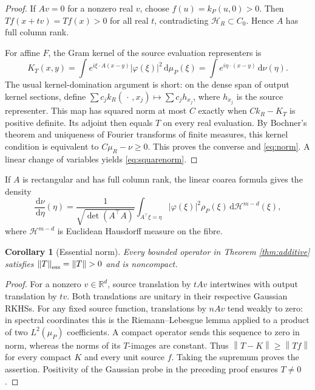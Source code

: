 \documentclass[11pt,a4paper]{article}
\newtheorem{corollary}[theorem]{Corollary}
\theoremstyle{remark}
\newcommand{\R}{\mathbb R}
\newcommand{\HH}{\mathcal H}
\newcommand{\dd}{\,\mathrm d}
\newcommand{\norm}[1]{\left\lVert#1\right\rVert}
\begin{document}
\begin{proof}
If $Av=0$ for a nonzero real $v$, choose
$f(u)=k_P(u,0)>0$. Then $Tf(x+tv)=Tf(x)>0$ for all real $t$,
contradicting $\HH_R\subset C_0$. Hence $A$ has full column rank.

For affine $F$, the Gram kernel of the source evaluation
representers is
\begin{equation}\label{eq:gramstationary}
 K_T(x,y)=\int e^{i\xi\cdot A(x-y)}|\varphi(\xi)|^2\dd\mu_P(\xi)
         =\int e^{i\eta\cdot(x-y)}\dd\nu(\eta).
\end{equation}
The usual kernel-domination argument is short: on the dense span
of output kernel sections, define
$\sum c_jk_R(\,\cdot\,,x_j)\mapsto\sum c_jh_{x_j}$,
where $h_{x_j}$ is the source representer. This map has squared
norm at most $C$ exactly when $Ck_R-K_T$ is positive definite.
Its adjoint then equals $T$ on every real evaluation.
By Bochner's theorem and uniqueness of Fourier transforms of finite
measures, this kernel condition is equivalent to
$C\mu_R-\nu\ge0$. This proves the converse and \eqref{eq:norm}.
A linear change of variables yields \eqref{eq:squarenorm}.
\end{proof}

If $A$ is rectangular and has full column rank, the linear coarea
formula gives the density
\begin{equation}\label{eq:coarea}
 \frac{\dd\nu}{\dd\eta}(\eta)=
 \frac{1}{\sqrt{\det(A^\top A)}}
 \int_{A^\top\xi=\eta}|\varphi(\xi)|^2\rho_P(\xi)
                   \dd\mathcal H^{m-d}(\xi),
\end{equation}
where $\mathcal H^{m-d}$ is Euclidean Hausdorff measure on the fibre.

\begin{corollary}[Essential norm]\label{cor:essential}
Every bounded operator in Theorem \ref{thm:additive} satisfies
$\norm{T}_{\rm ess}=\norm{T}>0$ and is noncompact.
\end{corollary}

\begin{proof}
For a nonzero $v\in\R^d$, source translation by $tAv$ intertwines
with output translation by $tv$. Both translations are unitary
in their respective Gaussian RKHSs. For any fixed source function,
translations by $nAv$ tend weakly to zero: in spectral coordinates
this is the Riemann--Lebesgue lemma applied to a product of two
$L^2(\mu_P)$ coefficients. A compact operator sends this sequence
to zero in norm, whereas the norms of its $T$-images are constant.
Thus $\norm{T-K}\ge\norm{Tf}$ for every compact $K$ and every unit
source $f$. Taking the supremum proves the assertion. Positivity
of the Gaussian probe in the preceding proof ensures $T\ne0$.
\end{proof}
\end{document}
